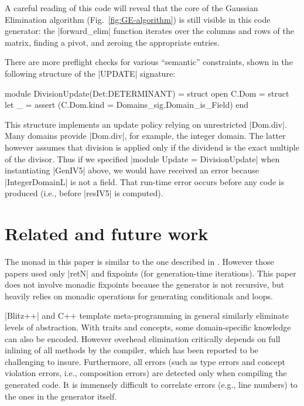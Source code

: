 \documentclass{elsart}
\begin{document}
A careful reading of this code will reveal that the core of the 
Gaussian Elimination algorithm (Fig.~\ref{fig:GE-algorithm}) 
is still visible in this code generator:
the |forward_elim| function iterates over the columns and rows of the
matrix, finding a pivot, and zeroing the appropriate entries.

There are more preflight checks for various ``semantic'' constraints, shown
in the following structure of the |UPDATE| signature:
\begin{code}
module DivisionUpdate(Det:DETERMINANT) =
  struct
  open C.Dom = struct 
  let _ = assert (C.Dom.kind = Domains_sig.Domain_is_Field)
end
\end{code}
%
This structure implements an update policy relying on
unrestricted |Dom.div|. Many domains provide |Dom.div|, for example,
the integer domain. The latter however assumes that division is applied
only if the dividend is the exact multiple of the divisor. Thus if we
specified |module Update = DivisionUpdate| when instantiating |GenIV5|
above, we would have received an error because |IntegerDomainL| is not
a field. That run-time error occurs before any code is produced (i.e.,
before |resIV5| is computed).

\section{Related and future work}\label{related}

The monad in this paper is similar to the one described in
\cite{SwadiMonadic06,KiselyovTaha}.  However those papers used only
|retN| and fixpoints (for generation-time iterations).  This paper
does not involve monadic fixpoints because the generator is not
recursive, but heavily relies on monadic operations for generating
conditionals and loops.

|Blitz++| \cite{Veldhuizen:1998:ISCOPE} and {C++} template
meta-programming in general similarly eliminate levels
of abstraction.  With traits and concepts, some domain-specific
knowledge can also be encoded.  However overhead elimination
critically depends on full inlining of all methods by the compiler,
which has been reported to be challenging to insure. Furthermore, all
errors (such as type errors and concept violation errors, i.e.,
composition errors) are detected only when compiling the generated
code. It is immensely difficult to correlate errors (e.g., line
numbers) to the ones in the generator itself.
\end{document}
